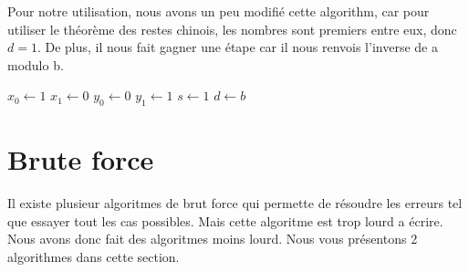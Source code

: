 \documentclass[a4paper, 11pt]{article}
\begin{document}
\newline
Pour notre utilisation, nous avons un peu modifié cette algorithm, car pour utiliser le théorème des restes chinois, les nombres sont premiers entre eux,
donc $d=1$. De plus, il nous fait gagner une étape car il nous renvois l'inverse de a modulo b.
\begin{algorithm}
    $x_0 \leftarrow 1 $ \;
    $x_1 \leftarrow 0 $ \;
    $y_0 \leftarrow 0 $ \;
    $y_1 \leftarrow 1 $ \;
    $s \leftarrow 1 $ \;
    $d \leftarrow b $ \;
\end{algorithm}



\newpage

\section{Brute force}
Il existe plusieur algoritmes de brut force qui permette de résoudre les erreurs tel que essayer tout les cas possibles. Mais cette algoritme est trop lourd a écrire. Nous avons donc fait des algoritmes moins lourd.
Nous vous présentons 2 algorithmes dans cette section.
\end{document}

